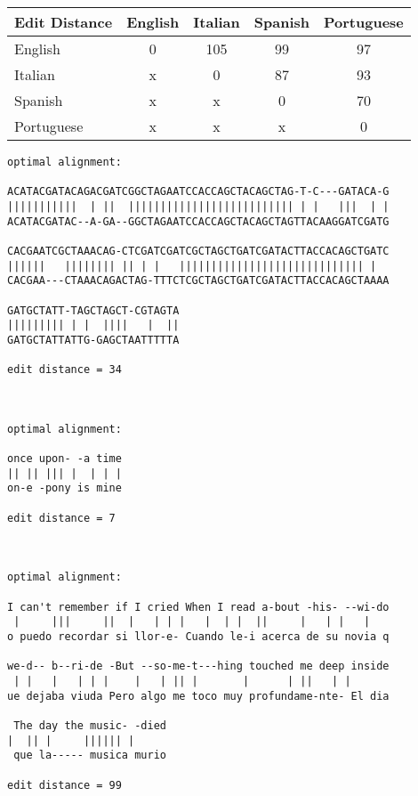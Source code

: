 \documentclass{article}
\begin{document}
\begin{center}
  \begin{tabular}{|l||cccc|}
    \hline
    Edit Distance & English & Italian & Spanish & Portuguese\\
    \hline
    \hline
    English & 0 & 105 & 99 & 97\\
    \hline
    Italian & x & 0 & 87 & 93\\
    \hline
    Spanish & x & x & 0 & 70\\
    \hline
    Portuguese & x & x & x & 0\\
    \hline
  \end{tabular}
\end{center}
\begin{verbatim}
optimal alignment: 

ACATACGATACAGACGATCGGCTAGAATCCACCAGCTACAGCTAG-T-C---GATACA-G
|||||||||||  | ||  |||||||||||||||||||||||||| | |   |||  | |
ACATACGATAC--A-GA--GGCTAGAATCCACCAGCTACAGCTAGTTACAAGGATCGATG

CACGAATCGCTAAACAG-CTCGATCGATCGCTAGCTGATCGATACTTACCACAGCTGATC
||||||   |||||||| || | |   ||||||||||||||||||||||||||||| |  
CACGAA---CTAAACAGACTAG-TTTCTCGCTAGCTGATCGATACTTACCACAGCTAAAA

GATGCTATT-TAGCTAGCT-CGTAGTA
||||||||| | |  ||||   |  ||
GATGCTATTATTG-GAGCTAATTTTTA

edit distance = 34



optimal alignment: 

once upon- -a time
|| || ||| |  | | |
on-e -pony is mine

edit distance = 7



optimal alignment: 

I can't remember if I cried When I read a-bout -his- --wi-do
 |     |||     ||  |   | | |   |  | |  ||     |   | |   |   
o puedo recordar si llor-e- Cuando le-i acerca de su novia q
                                                                                                                       
we-d-- b--ri-de -But --so-me-t---hing touched me deep inside                                                           
 | |   |   | | |    |   | || |       |      | ||   | |                                                                 
ue dejaba viuda Pero algo me toco muy profundame-nte- El dia                                                           
                                                                                                                       
 The day the music- -died                                                                                              
|  || |     |||||| |                                                                                                   
 que la----- musica murio                                                                                              
                                                                                                                       
edit distance = 99                                                                                                     
\end{verbatim}
                  
\end{document}
